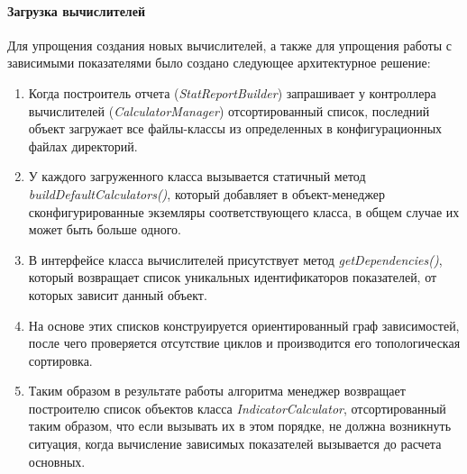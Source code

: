 \paragraph{Загрузка вычислителей} Для упрощения создания новых вычислителей, а также для упрощения работы
с зависимыми показателями было создано следующее архитектурное решение:
\begin{enumerate}
\item{
  Когда построитель отчета (\textit{StatReportBuilder}) запрашивает у контроллера вычислителей
(\textit{CalculatorManager}) отсортированный список, последний объект загружает все файлы-классы
из определенных в конфигурационных файлах директорий.
}
\item{
  У каждого загруженного класса вызывается статичный метод \textit{buildDefaultCalculators()},
  который добавляет в объект-менеджер сконфигурированные экземляры соответствующего класса, в общем случае
их может быть больше одного.
}
\item{
  В интерфейсе класса вычислителей присутствует метод \textit{getDependencies()}, который возвращает
список уникальных идентификаторов показателей, от которых зависит данный объект. 
}
\item{
  На основе этих списков конструируется ориентированный граф зависимостей, после чего проверяется отсутствие
циклов и производится его топологическая сортировка.
}
\item{
  Таким образом в результате работы алгоритма менеджер возвращает построителю список объектов класса
\textit{IndicatorCalculator}, отсортированный таким образом, что если вызывать их в этом порядке,
не должна возникнуть ситуация, когда вычисление зависимых показателей вызывается до расчета основных.
}
\end{enumerate}

